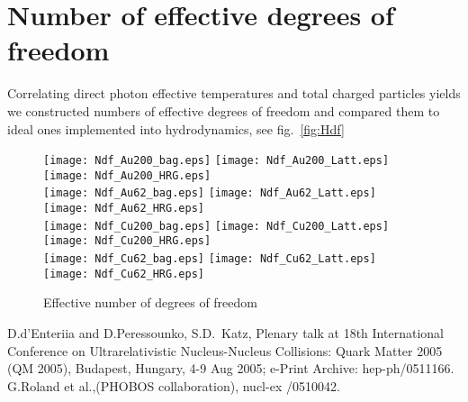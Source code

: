 \documentclass[aps,twocolumn,groupedaddress,superscriptaddress,floatfix]{revtex4}
\begin{document}
\section{Number of effective degrees of freedom}
Correlating direct photon effective temperatures and total charged
particles yields we constructed numbers of effective degrees of
freedom and compared them to ideal ones implemented into
hydrodynamics, see fig.~\ref{fig:Hdf}

\begin{figure*}[t]
\texttt{[image: Ndf\_Au200\_bag.eps]}
\texttt{[image: Ndf\_Au200\_Latt.eps]}
\texttt{[image: Ndf\_Au200\_HRG.eps]} \\
\texttt{[image: Ndf\_Au62\_bag.eps]}
\texttt{[image: Ndf\_Au62\_Latt.eps]}
\texttt{[image: Ndf\_Au62\_HRG.eps]} \\
\texttt{[image: Ndf\_Cu200\_bag.eps]}
\texttt{[image: Ndf\_Cu200\_Latt.eps]}
\texttt{[image: Ndf\_Cu200\_HRG.eps]} \\
\texttt{[image: Ndf\_Cu62\_bag.eps]}
\texttt{[image: Ndf\_Cu62\_Latt.eps]}
\texttt{[image: Ndf\_Cu62\_HRG.eps]} \\
\caption{Effective number of degrees of freedom}\label{fig:Ndf}
\end{figure*}




\begin{thebibliography}{99}
D.d'Enteriia and D.Peressounko,
S.D.~Katz, Plenary talk at 18th International Conference on Ultrarelativistic Nucleus-Nucleus
Collisions: Quark Matter 2005 (QM 2005), Budapest, Hungary, 4-9
Aug 2005; e-Print Archive: hep-ph/0511166.
G.Roland et al.,(PHOBOS collaboration),
nucl-ex /0510042.
\end{thebibliography}
\end{document}
